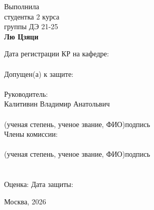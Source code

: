 \documentclass[11pt,a4paper,openany]{report}
\begin{document}
\begin{titlepage}
\vspace{5pt}

\begin{flushright}
\begin{minipage}{0.55\textwidth}
\normalsize
Выполнила\\
студентка 2 курса\\
группы ДЭ 21-25\\[2pt]
\textbf{Лю Цзяци}
\end{minipage}
\end{flushright}

\vspace{5pt}

\begingroup\small
\begin{flushleft}
Дата регистрации КР на кафедре:\\[2pt]
\underline{\hspace{6.5cm}}\\[2pt]
Допущен(а) к защите:\\[2pt]
\underline{\hspace{6.5cm}}\\[2pt]
Руководитель:\\[2pt]
Калитивин Владимир Анатольвич\\[2pt]
\underline{\hspace{6.5cm}}\\[-2pt]
{\footnotesize (ученая степень, ученое звание, ФИО)\hfill подпись}\\[8pt]
Члены комиссии:\\[3pt]
\underline{\hspace{6.5cm}}\hfill\underline{\hspace{3.5cm}}\\[-2pt]
{\footnotesize (ученая степень, ученое звание, ФИО)\hfill подпись}\\[2pt]
\underline{\hspace{6.5cm}}\hfill\underline{\hspace{3.5cm}}\\[2pt]
\underline{\hspace{6.5cm}}\hfill\underline{\hspace{3.5cm}}\\[4pt]
Оценка: \underline{\hspace{2.6cm}} \hfill Дата защиты: \underline{\hspace{2.6cm}}
\end{flushleft}
\endgroup

\vspace{8pt}
\begin{center}\normalsize Москва, 2026\end{center}
\end{titlepage}
\end{document}
